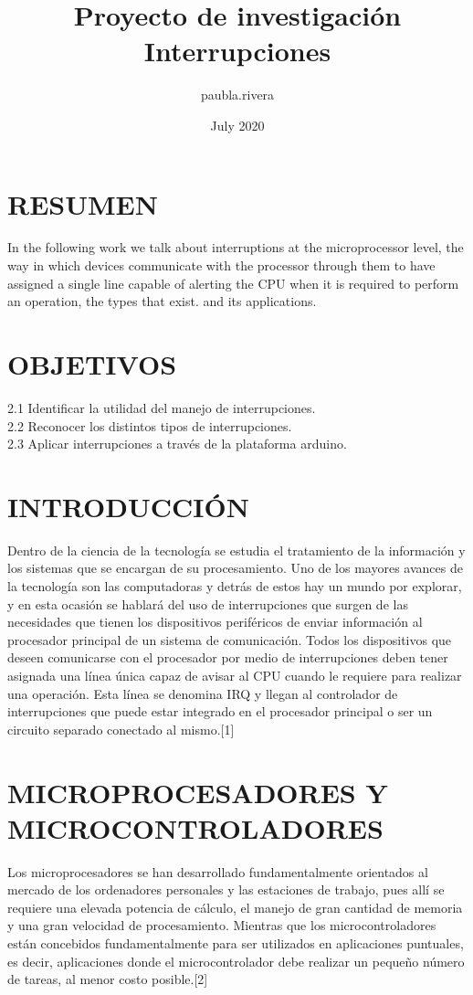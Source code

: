 \documentclass{article}
\title{Proyecto de investigación Interrupciones}
\author{paubla.rivera }
\date{July 2020}
\begin{document}
\maketitle

\section{RESUMEN}
In the following work we talk about interruptions at the microprocessor level, the way in which devices communicate with the processor through them to have assigned a single line capable of alerting the CPU when it is required to perform an operation, the types that exist. and its applications.


\section{OBJETIVOS}
2.1 Identificar la utilidad del manejo de interrupciones. \\
2.2 Reconocer los distintos tipos de interrupciones. \\
2.3 Aplicar interrupciones a través de la plataforma arduino.


\section{INTRODUCCIÓN}
Dentro de la ciencia de la tecnología se estudia el tratamiento de la información y los sistemas que se encargan de su procesamiento. Uno de los mayores avances de la tecnología son las computadoras y  detrás de estos hay un mundo por explorar, y  en esta ocasión se hablará del uso de interrupciones que surgen de las necesidades que tienen los dispositivos periféricos de enviar información al procesador principal de un sistema de comunicación. Todos los dispositivos que deseen comunicarse con el procesador por medio de interrupciones deben tener asignada una línea única capaz de avisar al CPU cuando le requiere para realizar una operación. Esta línea se denomina IRQ y llegan al controlador de interrupciones que puede estar integrado en el procesador principal o ser un circuito separado conectado al mismo.[1]



\section{	MICROPROCESADORES Y MICROCONTROLADORES}

Los microprocesadores se han desarrollado fundamentalmente orientados al mercado de los ordenadores personales y las estaciones de trabajo, pues allí se requiere una elevada potencia de cálculo, el manejo de gran cantidad de memoria y una gran velocidad de procesamiento. Mientras que los microcontroladores están concebidos fundamentalmente para ser utilizados en aplicaciones puntuales, es decir, aplicaciones donde el microcontrolador debe realizar un pequeño número de tareas, al menor costo posible.[2]
\end{document}
